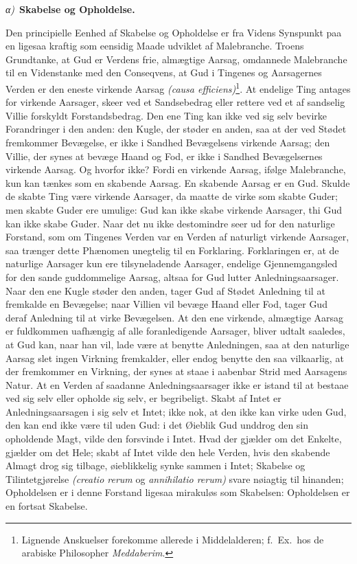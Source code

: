 \documentclass[12pt]{book}
\newcommand{\greekrun}[2]{%
  \medskip\begin{center}{\itshape #1)}\ {\bfseries #2}\end{center}\medskip}
\begin{document}
\greekrun{α}{Skabelse og Opholdelse.}

Den principielle Eenhed af Skabelse og Opholdelse er fra Videns
Synspunkt paa en ligesaa kraftig som eensidig Maade udviklet af
Malebranche. Troens Grundtanke, at Gud er Verdens frie, almægtige
Aarsag, omdannede Malebranche til en Videnstanke med den Conseqvens,
at Gud i Tingenes og Aarsagernes Verden er den eneste virkende
Aarsag \textit{(causa efficiens)}\footnote{Lignende Anskuelser
forekomme allerede i Middelalderen; f.\ Ex.\ hos de arabiske
Philosopher \textit{Meddaberim}.}. At endelige Ting antages for
virkende Aarsager, skeer ved et Sandsebedrag eller rettere ved et af
sandselig Villie forskyldt Forstandsbedrag. Den ene Ting kan ikke
ved sig selv bevirke Forandringer i den anden: den Kugle, der støder
en anden, saa at der ved Stødet fremkommer Bevægelse, er ikke i
Sandhed Bevægelsens virkende Aarsag; den Villie, der synes at bevæge
Haand og Fod, er ikke i Sandhed Bevægelsernes virkende Aarsag. Og
hvorfor ikke? Fordi en virkende Aarsag, ifølge Malebranche, kun kan
tænkes som en skabende Aarsag. En skabende Aarsag er en Gud. Skulde
de skabte Ting være virkende Aarsager, da maatte de virke som skabte
Guder; men skabte Guder ere umulige: Gud kan ikke skabe virkende
Aarsager, thi Gud kan ikke skabe Guder. Naar det nu ikke
destomindre seer ud for den naturlige Forstand, som om Tingenes
Verden var en Verden af naturligt virkende Aarsager, saa trænger
dette Phænomen unegtelig til en Forklaring. Forklaringen er, at de
naturlige Aarsager kun ere tilsyneladende Aarsager, endelige
Gjennemgangsled for den sande guddommelige Aarsag, altsaa for Gud
lutter Anledningsaarsager. Naar den ene Kugle støder den anden,
tager Gud af Stødet Anledning til at fremkalde en Bevægelse; naar
Villien vil bevæge Haand eller Fod, tager Gud deraf Anledning til at
virke Bevægelsen. At den ene virkende, almægtige Aarsag er
fuldkommen uafhængig af alle foranledigende Aarsager, bliver udtalt
saaledes, at Gud kan, naar han vil, lade være at benytte
Anledningen, saa at den naturlige Aarsag slet ingen Virkning
fremkalder, eller endog benytte den saa vilkaarlig, at der
fremkommer en Virkning, der synes at staae i aabenbar Strid med
Aarsagens Natur.
At en Verden af saadanne Anledningsaarsager ikke er istand til at
bestaae ved sig selv eller opholde sig selv, er begribeligt. Skabt
af Intet er Anledningsaarsagen i sig selv et Intet; ikke nok, at den
ikke kan virke uden Gud, den kan end ikke være til uden Gud: i det
Øieblik Gud unddrog den sin opholdende Magt, vilde den forsvinde i
Intet. Hvad der gjælder om det Enkelte, gjælder om det Hele; skabt
af Intet vilde den hele Verden, hvis den skabende Almagt drog sig
tilbage, øieblikkelig synke sammen i Intet; Skabelse og
Tilintetgjørelse \textit{(creatio rerum} og \textit{annihilatio
rerum)} svare nøiagtig til hinanden; Opholdelsen er i denne Forstand
ligesaa mirakuløs som Skabelsen: Opholdelsen er en fortsat Skabelse.
\end{document}
